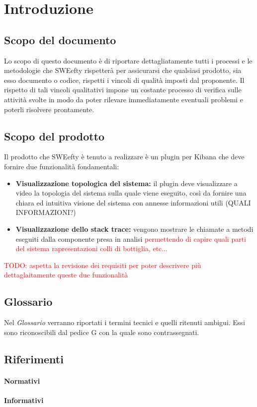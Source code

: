 \section{Introduzione}
	\subsection{Scopo del documento}
	Lo scopo di questo documento è di riportare dettagliatamente tutti i processi e le metodologie che SWEefty rispetterà per assicurarsi che qualsiasi prodotto, sia esso documento o codice, rispetti i vincoli di qualità imposti dal proponente.
	Il rispetto di tali vincoli qualitativi impone un costante processo di verifica sulle attività svolte in modo da poter rilevare immediatamente eventuali problemi e poterli risolvere prontamente.
	\subsection{Scopo del prodotto}
	Il prodotto che SWEefty è tenuto a  realizzare è un plugin per Kibana che deve fornire due funzionalità fondamentali:
	\begin{itemize}
		\item \textbf{Visualizzazione topologica del sistema:} il plugin deve visualizzare a video la topologia del sistema sulla quale viene eseguito, così da fornire una chiara ed intuitiva visione del sistema con annesse informazioni utili (QUALI INFORMAZIONI?)
		\item \textbf{Visualizzazione dello stack trace:} vengono mostrare le chiamate a metodi eseguiti dalla componente presa in analisi \textcolor{red}{permettendo di capire quali parti del sistema rapresentazioni colli di bottiglia, etc...}
	\end{itemize}
		\textcolor{red}{TODO: aspetta la revisione dei requisiti per poter descrivere più dettaglaitamente queste due funzionalità}
	\subsection{Glossario}
	Nel \emph{Glossario} verranno riportati i termini tecnici e quelli ritenuti ambigui. Essi sono riconoscibili dal pedice G con la quale sono contrassegnati.
	\subsection{Riferimenti}
		\paragraph{Normativi}
		\paragraph{Informativi}
